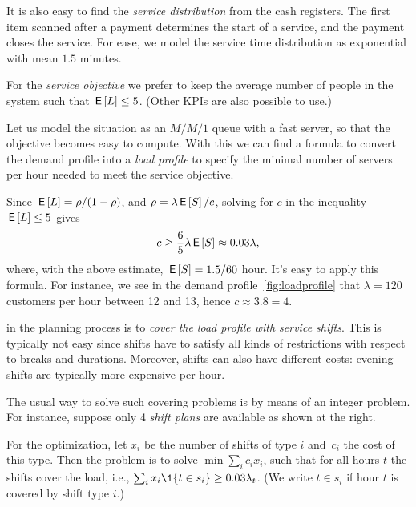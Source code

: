 It is also easy to find the\emph{ service distribution} from the cash registers.
The first item scanned after a payment determines the start of a service, and the payment closes the service. For ease, we model the service time distribution as exponential with mean $1.5$ minutes.

For the \emph{service objective} we prefer to keep the average number of people in the system such that $\,\mathsf{E}\left[L\right] \leq 5$. (Other KPIs are also possible to use.)

Let us model the situation as an $M/M/1$ queue with a fast server, so that the objective becomes easy to compute.  With this we can find a formula to convert the demand profile into a \emph{load profile} to  specify the minimal number of servers per hour needed to meet the service objective.

Since $\,\mathsf{E}\left[L\right] = \rho/(1-\rho)$, and $\rho=\lambda \,\mathsf{E}\left[S\right] /c$, solving for $c$ in the inequality $\,\mathsf{E}\left[L\right] \leq 5$ gives
\begin{equation*}
c \geq \frac 6 5 \lambda \,\mathsf{E}\left[S\right] \approx 0.03 \lambda,
\end{equation*}
where, with  the above estimate, $\,\mathsf{E}\left[S\right]=1.5/60$ hour.
It's easy to apply this formula. For instance,  we see in the demand profile~\cref{fig:loadprofile} that $\lambda= 120$ customers per hour between 12 and 13, hence $c\approx 3.8 = 4$.

 in the planning process is to \emph{cover the load profile with service shifts}.
This is typically not easy since shifts have to satisfy all kinds of restrictions with respect to breaks and durations.  Moreover, shifts can also have different costs: evening shifts are typically  more expensive per hour.

The usual way to solve such covering problems is by means of an integer
problem. For instance, suppose only 4 \emph{shift plans} are available as shown at the right.

For the optimization, let $x_i$ be the number of shifts of type $i$ and~$c_i$ the cost of this type.
Then the problem is to solve $\min \sum_i c_i x_i$,
such that for all hours $t$ the shifts cover the load, i.e., $\sum_i x_i \1{t \in s_i} \geq 0.03 \lambda_t$.
(We write $t\in s_i$ if hour $t$ is covered by shift type $i$.)

